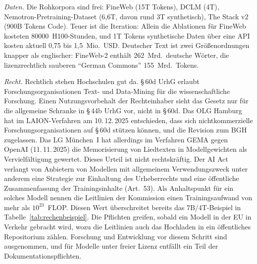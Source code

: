 \documentclass[a4paper,11pt]{article}
\begin{document}
\emph{Daten.} Die Rohkorpora sind frei: FineWeb (15T Tokens), DCLM
(4T), Nemotron-Pretraining-Dataset (6,6T, davon rund 3T synthetisch),
The Stack v2 (900B Tokens Code). Teuer ist die Iteration: Allein die
Ablationen für FineWeb kosteten \num{80000}~H100-Stunden, und 1T Tokens
synthetische Daten über eine API kosten aktuell 0,75 bis 1,5~Mio.\
USD. Deutscher Text ist zwei Größenordnungen knapper als englischer:
FineWeb-2 enthält 262~Mrd.\ deutsche Wörter, die lizenzrechtlich
sauberen \enquote{German Commons} 155~Mrd.\ Tokens.

\emph{Recht.} Rechtlich stehen Hochschulen gut da.  \S\,60d UrhG
erlaubt Forschungsorganisationen Text- und Data-Mining für die
wissenschaftliche Forschung.  Einen Nutzungsvorbehalt der
Rechteinhaber sieht das Gesetz nur für die allgemeine Schranke in
\S\,44b UrhG vor, nicht in \S\,60d.  Das OLG Hamburg hat im
LAION-Verfahren am 10.\,12.\,2025 entschieden, dass sich
nichtkommerzielle Forschungsorganisationen auf \S\,60d stützen
können, und die Revision zum BGH zugelassen.  Das LG München~I hat
allerdings im Verfahren GEMA gegen OpenAI (11.\,11.\,2025) die
Memorisierung von Liedtexten in Modellgewichten als Vervielfältigung
gewertet.  Dieses Urteil ist nicht rechtskräftig.  Der AI Act
verlangt von Anbietern von Modellen mit allgemeinem Verwendungszweck
unter anderem eine Strategie zur Einhaltung des Urheberrechts und eine
öffentliche Zusammenfassung der Trainingsinhalte (Art.~53).  Als
Anhaltspunkt für ein solches Modell nennen die Leitlinien der
Kommission einen Trainingsaufwand von mehr als $10^{23}$~FLOP.  Diesen
Wert überschreitet bereits das 7B/4T-Beispiel in
Tabelle~\ref{tab:rechenbeispiel}.  Die Pflichten greifen, sobald ein
Modell in der EU in Verkehr gebracht wird, wozu die Leitlinien auch
das Hochladen in ein öffentliches Repositorium zählen.  Forschung und
Entwicklung vor diesem Schritt sind ausgenommen, und für Modelle unter
freier Lizenz entfällt ein Teil der Dokumentationspflichten.
\end{document}
